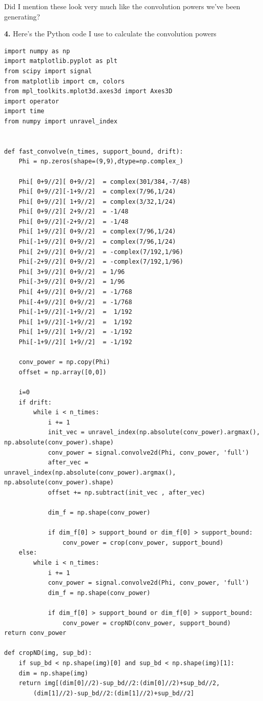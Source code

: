 \documentclass{article}
\theoremstyle{definition}
\begin{document}
Did I mention these look very much like the convolution powers we've been generating?







\newpage

\noindent \textbf{4.} Here's the Python code I use to calculate the convolution powers
\begin{lstlisting}
import numpy as np
import matplotlib.pyplot as plt
from scipy import signal
from matplotlib import cm, colors
from mpl_toolkits.mplot3d.axes3d import Axes3D
import operator
import time
from numpy import unravel_index


def fast_convolve(n_times, support_bound, drift):
	Phi = np.zeros(shape=(9,9),dtype=np.complex_)

	Phi[ 0+9//2][ 0+9//2]  = complex(301/384,-7/48)
	Phi[ 0+9//2][-1+9//2]  = complex(7/96,1/24)     
	Phi[ 0+9//2][ 1+9//2]  = complex(3/32,1/24)      
	Phi[ 0+9//2][ 2+9//2]  = -1/48               
	Phi[ 0+9//2][-2+9//2]  = -1/48
	Phi[ 1+9//2][ 0+9//2]  = complex(7/96,1/24)
	Phi[-1+9//2][ 0+9//2]  = complex(7/96,1/24)
	Phi[ 2+9//2][ 0+9//2]  = -complex(7/192,1/96)
	Phi[-2+9//2][ 0+9//2]  = -complex(7/192,1/96)
	Phi[ 3+9//2][ 0+9//2]  = 1/96
	Phi[-3+9//2][ 0+9//2]  = 1/96
	Phi[ 4+9//2][ 0+9//2]  = -1/768
	Phi[-4+9//2][ 0+9//2]  = -1/768
	Phi[-1+9//2][-1+9//2]  =  1/192
	Phi[ 1+9//2][-1+9//2]  =  1/192
	Phi[ 1+9//2][ 1+9//2]  = -1/192
	Phi[-1+9//2][ 1+9//2]  = -1/192

	conv_power = np.copy(Phi)
	offset = np.array([0,0])

	i=0
	if drift:
		while i < n_times:
			i += 1
			init_vec = unravel_index(np.absolute(conv_power).argmax(), np.absolute(conv_power).shape)
			conv_power = signal.convolve2d(Phi, conv_power, 'full')
			after_vec = unravel_index(np.absolute(conv_power).argmax(), np.absolute(conv_power).shape)
			offset += np.subtract(init_vec , after_vec)

			dim_f = np.shape(conv_power)
	
			if dim_f[0] > support_bound or dim_f[0] > support_bound:
				conv_power = crop(conv_power, support_bound)
	else:
		while i < n_times:
			i += 1
			conv_power = signal.convolve2d(Phi, conv_power, 'full')
			dim_f = np.shape(conv_power)

			if dim_f[0] > support_bound or dim_f[0] > support_bound:
				conv_power = cropND(conv_power, support_bound)
return conv_power

def cropND(img, sup_bd):
	if sup_bd < np.shape(img)[0] and sup_bd < np.shape(img)[1]:
	dim = np.shape(img)
	return img[(dim[0]//2)-sup_bd//2:(dim[0]//2)+sup_bd//2,
		(dim[1]//2)-sup_bd//2:(dim[1]//2)+sup_bd//2]


\end{lstlisting}
\end{document}
